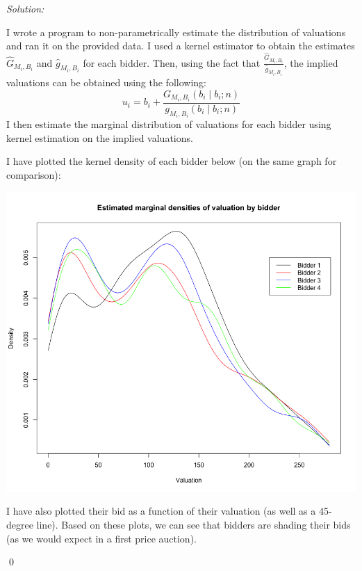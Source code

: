 \documentclass[12pt]{article}
\newenvironment{problem}[2][Problem]{\begin{trivlist}
\item[\hskip \labelsep {\bfseries #1}\hskip \labelsep {\bfseries #2.}]}{\end{trivlist}}
\newenvironment{sol}
    {\emph{Solution:}
    }
    {
    \qed
    }
\begin{document}
\begin{problem}{1}
\end{problem}
\begin{sol}
    I wrote a program to non-parametrically estimate the distribution of valuations and ran it on the provided data. I used a kernel estimator to obtain the estimates $\hat{G}_{M_i, B_i}$ and $\hat{g}_{M_i, B_i}$ for each bidder. Then, using the fact that $\frac{\hat{G}_{M_i, B_i}}{\hat{g}_{M_i, B_i}}$, the implied valuations can be obtained using the following:
    \[u_i = b_i + \frac{G_{M_i, B_i}(b_i \mid b_i; n)}{g_{M_i, B_i}(b_i \mid b_i; n)}\]
    I then estimate the marginal distribution of valuations for each bidder using kernel estimation on the implied valuations. 
    
    I have plotted the kernel density of each bidder below (on the same graph for comparison):
    \begin{center}
        \includegraphics[scale=0.45]{Valuation Dist.png}
    \end{center}
    I have also plotted their bid as a function of their valuation (as well as a 45-degree line). Based on these plots, we can see that bidders are shading their bids (as we would expect in a first price auction).
    \begin{center}

\end{center}
\end{sol}
\end{document}
